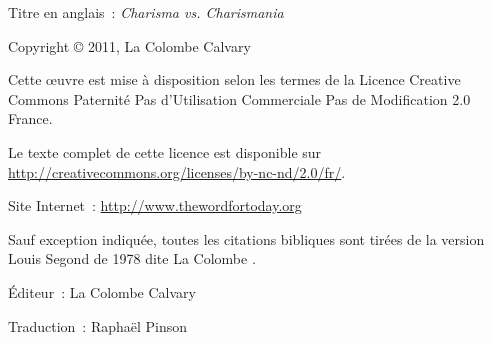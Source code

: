 \newpage
\mbox{}
\vfill
\noindent Titre en anglais~: \emph{Charisma vs. Charismania}

\noindent Copyright \copyright{} 2011, La Colombe Calvary


\noindent \ccbyncnd

\noindent Cette \oe{}uvre est mise à disposition selon les termes de la
 Licence Creative Commons Paternité
 \ocadr Pas d'Utilisation Commerciale \ocadr Pas de Modification 2.0 France.

\noindent Le texte complet de cette licence est disponible sur \\
 \url{http://creativecommons.org/licenses/by-nc-nd/2.0/fr/}.

\noindent Site Internet~: \url{http://www.thewordfortoday.org}

\noindent Sauf exception indiquée, toutes les citations bibliques sont
 tirées de la version Louis Segond de 1978 dite \og La Colombe \fg{}.

\noindent Éditeur~: La Colombe Calvary

\noindent Traduction~: Raphaël Pinson

